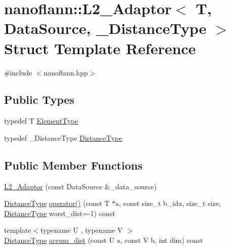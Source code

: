 \hypertarget{structnanoflann_1_1_l2___adaptor}{\section{nanoflann\-:\-:L2\-\_\-\-Adaptor$<$ T, Data\-Source, \-\_\-\-Distance\-Type $>$ Struct Template Reference}
\label{structnanoflann_1_1_l2___adaptor}
}


{\ttfamily \#include $<$nanoflann.\-hpp$>$}

\subsection*{Public Types}
\begin{DoxyCompactItemize}
\item 
typedef T \hyperlink{structnanoflann_1_1_l2___adaptor_aac410b6db5faa57a07f452420cd86d53}{Element\-Type}
\item 
typedef \-\_\-\-Distance\-Type \hyperlink{structnanoflann_1_1_l2___adaptor_a2b74f6c8a8b13c2d28cd77c9f0da39e2}{Distance\-Type}
\end{DoxyCompactItemize}
\subsection*{Public Member Functions}
\begin{DoxyCompactItemize}
\item 
\hyperlink{structnanoflann_1_1_l2___adaptor_a53b7677f3ba398ab5ba513577b4d38de}{L2\-\_\-\-Adaptor} (const Data\-Source \&\-\_\-data\-\_\-source)
\item 
\hyperlink{structnanoflann_1_1_l2___adaptor_a2b74f6c8a8b13c2d28cd77c9f0da39e2}{Distance\-Type} \hyperlink{structnanoflann_1_1_l2___adaptor_a70fe24865199691cf988d83ccc76cee8}{operator()} (const T $\ast$a, const size\-\_\-t b\-\_\-idx, size\-\_\-t size, \hyperlink{structnanoflann_1_1_l2___adaptor_a2b74f6c8a8b13c2d28cd77c9f0da39e2}{Distance\-Type} worst\-\_\-dist=-\/1) const 
\item 
{\footnotesize template$<$typename U , typename V $>$ }\\\hyperlink{structnanoflann_1_1_l2___adaptor_a2b74f6c8a8b13c2d28cd77c9f0da39e2}{Distance\-Type} \hyperlink{structnanoflann_1_1_l2___adaptor_a0f70a0d32d2dd5f4af6e97b42a50a374}{accum\-\_\-dist} (const U a, const V b, int dim) const 
\end{DoxyCompactItemize}
